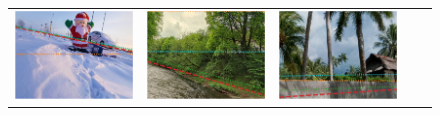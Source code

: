 \begin{figure}
\begin{tabular}{cccc|c}
\includegraphics[width=\exampleresultswidth\linewidth]{figures/method/results/pano_addtwdtklktubg_jpg-3.png} &
\includegraphics[width=\exampleresultswidth\linewidth]{figures/method/results/pano_addlmffiaizqlx_jpg-0.png} &
\includegraphics[width=\exampleresultswidth\linewidth]{figures/method/results/pano_addtdiecjavkue_jpg-1.png} &

\end{tabular}
\end{figure}
